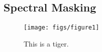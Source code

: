 
\subsection{Spectral Masking}


\begin{figure*}
  \texttt{[image: figs/figure1]}
  \caption{This is a tiger.}
\end{figure*}